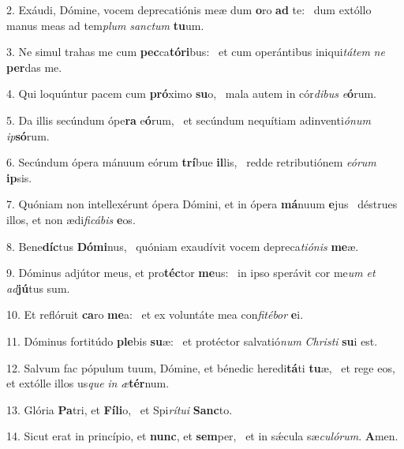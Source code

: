 2. Exáudi, Dómine, vocem deprecatiónis meæ dum \textbf{o}ro \textbf{ad} te: \ast\  dum extóllo manus meas ad tem\textit{plum} \textit{sanc}\textit{tum} \textbf{tu}um.\

3. Ne simul trahas me cum \textbf{pec}ca\textbf{tó}\textbf{ri}bus: \ast\  et cum operántibus iniqui\textit{tá}\textit{tem} \textit{ne} \textbf{per}das me.\

4. Qui loquúntur pacem cum \textbf{pró}ximo \textbf{su}o, \ast\  mala autem in cór\textit{di}\textit{bus} \textit{e}\textbf{ó}rum.\

5. Da illis secúndum ópe\textbf{ra} e\textbf{ó}rum, \ast\  et secúndum nequítiam adinventi\textit{ó}\textit{num} \textit{ip}\textbf{só}rum.\

6. Secúndum ópera mánuum eórum \textbf{trí}bue \textbf{il}lis, \ast\  redde retributiónem \textit{e}\textit{ó}\textit{rum} \textbf{ip}sis.\

7. Quóniam non intellexérunt ópera Dómini, et in ópera \textbf{má}nuum \textbf{e}jus \ast\  déstrues illos, et non ædi\textit{fi}\textit{cá}\textit{bis} \textbf{e}os.\

8. Bene\textbf{díc}tus \textbf{Dó}\textbf{mi}nus, \ast\  quóniam exaudívit vocem depreca\textit{ti}\textit{ó}\textit{nis} \textbf{me}æ.\

9. Dóminus adjútor meus, et pro\textbf{téc}tor \textbf{me}us: \ast\  in ipso sperávit cor me\textit{um} \textit{et} \textit{ad}\textbf{jú}tus sum.\

10. Et reflóruit \textbf{ca}ro \textbf{me}a: \ast\  et ex voluntáte mea con\textit{fi}\textit{té}\textit{bor} \textbf{e}i.\

11. Dóminus fortitúdo \textbf{ple}bis \textbf{su}æ: \ast\  et protéctor salvatió\textit{num} \textit{Chris}\textit{ti} \textbf{su}i est.\

12. Salvum fac pópulum tuum, Dómine, et bénedic heredi\textbf{tá}ti \textbf{tu}æ, \ast\  et rege eos, et extólle illos us\textit{que} \textit{in} \textit{æ}\textbf{tér}num.\

13. Glória \textbf{Pa}tri, et \textbf{Fí}\textbf{li}o, \ast\  et Spi\textit{rí}\textit{tu}\textit{i} \textbf{Sanc}to.\

14. Sicut erat in princípio, et \textbf{nunc}, et \textbf{sem}per, \ast\  et in sǽcula sæ\textit{cu}\textit{ló}\textit{rum}. \textbf{A}men.\

